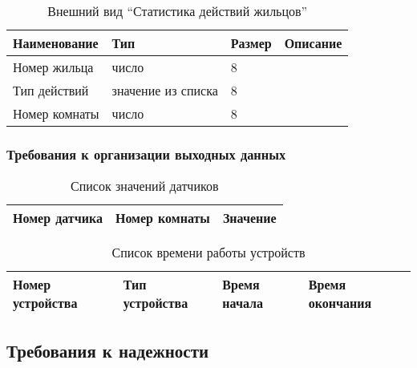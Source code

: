           \begin{table}[h!]
            \centering
            \caption{Внешний вид “Статистика действий жильцов”}
            \label{room:size}
            \begin{tabular}{|l|l|l|l|}
            \hline
            Наименование & Тип & Размер & Описание \\ \hline
            Номер жильца & число & 8 & \\ \hline
            Тип действий & значение из списка & 8 & \\ \hline
            Номер комнаты & число & 8 & \\ \hline
            \end{tabular}
          \end{table} 
    \subsubsection{Требования к организации выходных данных}
      \begin{table}[h!]
      \centering
      \caption{Список значений датчиков}
      \label{sensor:statistic}
      \begin{tabular}{|l|l|l|}
      \hline
      Номер датчика & Номер комнаты & Значение \\ \hline
      \end{tabular}
      \end{table}
      
      \begin{table}[h!]
      \centering
      \caption{Список времени работы устройств}
      \label{device:statistic}
      \begin{tabular}{|l|l|l|l|}
      \hline
      Номер устройства & Тип устройства & Время начала & Время окончания \\ \hline
      \end{tabular}
      \end{table}
  \subsection{Требования к надежности}
